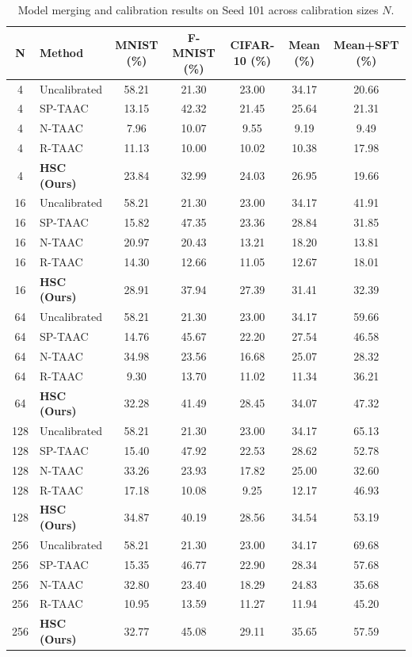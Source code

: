 \documentclass{article}
\begin{document}
\begin{table}[t]
\caption{Model merging and calibration results on Seed 101 across calibration sizes $N$.}
\label{tab:seed101}
\vskip 0.1in
\begin{center}
\begin{small}
\setlength{\tabcolsep}{6pt}
\begin{tabular}{clccccc}
\toprule
N & Method & MNIST (\%) & F-MNIST (\%) & CIFAR-10 (\%) & Mean (\%) & Mean+SFT (\%) \\
\midrule
4 & Uncalibrated & 58.21 & 21.30 & 23.00 & 34.17 & 20.66 \\
4 & SP-TAAC & 13.15 & 42.32 & 21.45 & 25.64 & 21.31 \\
4 & N-TAAC & 7.96 & 10.07 & 9.55 & 9.19 & 9.49 \\
4 & R-TAAC & 11.13 & 10.00 & 10.02 & 10.38 & 17.98 \\
4 & \textbf{HSC (Ours)} & 23.84 & 32.99 & 24.03 & 26.95 & 19.66 \\
\midrule
16 & Uncalibrated & 58.21 & 21.30 & 23.00 & 34.17 & 41.91 \\
16 & SP-TAAC & 15.82 & 47.35 & 23.36 & 28.84 & 31.85 \\
16 & N-TAAC & 20.97 & 20.43 & 13.21 & 18.20 & 13.81 \\
16 & R-TAAC & 14.30 & 12.66 & 11.05 & 12.67 & 18.01 \\
16 & \textbf{HSC (Ours)} & 28.91 & 37.94 & 27.39 & 31.41 & 32.39 \\
\midrule
64 & Uncalibrated & 58.21 & 21.30 & 23.00 & 34.17 & 59.66 \\
64 & SP-TAAC & 14.76 & 45.67 & 22.20 & 27.54 & 46.58 \\
64 & N-TAAC & 34.98 & 23.56 & 16.68 & 25.07 & 28.32 \\
64 & R-TAAC & 9.30 & 13.70 & 11.02 & 11.34 & 36.21 \\
64 & \textbf{HSC (Ours)} & 32.28 & 41.49 & 28.45 & 34.07 & 47.32 \\
\midrule
128 & Uncalibrated & 58.21 & 21.30 & 23.00 & 34.17 & 65.13 \\
128 & SP-TAAC & 15.40 & 47.92 & 22.53 & 28.62 & 52.78 \\
128 & N-TAAC & 33.26 & 23.93 & 17.82 & 25.00 & 32.60 \\
128 & R-TAAC & 17.18 & 10.08 & 9.25 & 12.17 & 46.93 \\
128 & \textbf{HSC (Ours)} & 34.87 & 40.19 & 28.56 & 34.54 & 53.19 \\
\midrule
256 & Uncalibrated & 58.21 & 21.30 & 23.00 & 34.17 & 69.68 \\
256 & SP-TAAC & 15.35 & 46.77 & 22.90 & 28.34 & 57.68 \\
256 & N-TAAC & 32.80 & 23.40 & 18.29 & 24.83 & 35.68 \\
256 & R-TAAC & 10.95 & 13.59 & 11.27 & 11.94 & 45.20 \\
256 & \textbf{HSC (Ours)} & 32.77 & 45.08 & 29.11 & 35.65 & 57.59 \\
\bottomrule
\end{tabular}
\end{small}
\end{center}
\end{table}
\end{document}

